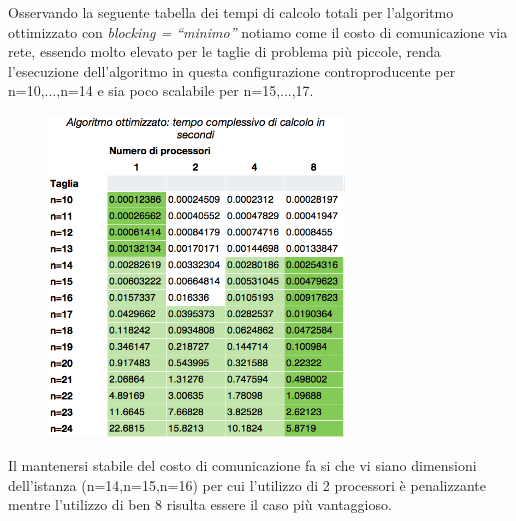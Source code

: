 \documentclass[12pt,a4paper,oneside,openright]{article}
\begin{document}
Osservando la seguente tabella dei tempi di calcolo totali per l'algoritmo ottimizzato con \emph{blocking = ``minimo''} notiamo come il costo di comunicazione via rete, essendo molto elevato per le taglie di problema più piccole, renda l'esecuzione dell'algoritmo in questa configurazione controproducente per n=10,...,n=14 e sia poco scalabile per  n=15,...,17.
\begin{figure}[htp] 
  \centering
      \includegraphics[width=0.7\textwidth, height=0.43\textheight]{immagini/algoritmo_ottimizzato_tempo_calcolo_con_rete}
\end{figure}
Il mantenersi stabile del costo di comunicazione fa si che vi siano dimensioni dell'istanza (n=14,n=15,n=16) per cui l'utilizzo di 2 processori è penalizzante mentre l'utilizzo di ben 8 risulta essere il caso più vantaggioso.
\end{document}
